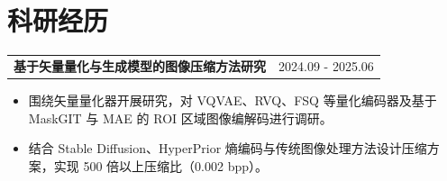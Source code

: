 \documentclass[UTF8]{article}
\begin{document}
\section*{\bfseries\large 科研经历}

\begin{tabularx}{\linewidth}{X r}
    \normalsize \textbf{基于矢量量化与生成模型的图像压缩方法研究} & 2024.09 - 2025.06 \\
\end{tabularx}
\begin{itemize}[leftmargin=1.6em, itemsep=0em, topsep=0.05em, parsep=0pt]
    \item 围绕矢量量化器开展研究，对 VQVAE、RVQ、FSQ 等量化编码器及基于 MaskGIT 与 MAE 的 ROI 区域图像编解码进行调研。
    \item 结合 Stable Diffusion、HyperPrior 熵编码与传统图像处理方法设计压缩方案，实现 500 倍以上压缩比（0.002 bpp）。
\end{itemize}


\end{document}
